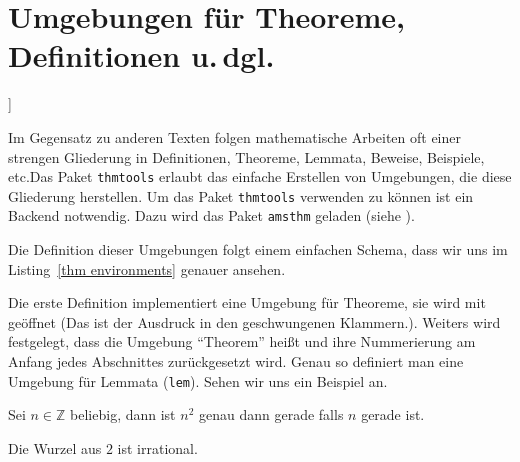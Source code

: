 
\section{Umgebungen für Theoreme, Definitionen u.\,dgl.}]

Im Gegensatz zu anderen Texten folgen mathematische Arbeiten oft einer strengen Gliederung in Definitionen, Theoreme, Lemmata, Beweise, Beispiele, etc.\@ Das Paket \texttt{thmtools} erlaubt das einfache Erstellen von Umgebungen, die diese Gliederung herstellen.
Um das Paket \texttt{thmtools} verwenden zu können ist ein Backend notwendig.
Dazu wird das Paket \texttt{amsthm} geladen (siehe \cite{amsthm}).


Die Definition dieser Umgebungen folgt einem einfachen Schema, dass wir uns im Listing~\ref{thm environments} genauer ansehen.

\begin{figure*}
\begin{example}[caption={Beispiel für die Definition von Theoremumgebungen},
label={thm environments}]
\usepackage{amsthm} %
\usepackage{thmtools}

	
\end{example}
\end{figure*}

Die erste Definition implementiert eine Umgebung für Theoreme, sie wird mit  geöffnet (Das ist der Ausdruck in den geschwungenen Klammern.).
Weiters wird festgelegt, dass die Umgebung "`Theorem"' heißt und ihre Nummerierung am Anfang jedes Abschnittes zurückgesetzt wird.
Genau so definiert man eine Umgebung für Lemmata (\texttt{lem}). Sehen wir uns ein Beispiel an.

\begin{LTXexample}[firstline=3]
\setcounter{thm}{0}
\setcounter{lem0}{0}
\begin{lem0}
    Sei $n \in \mathbb Z$ 
    beliebig, dann ist $n^2$ 
    genau dann gerade 
    falls $n$ gerade ist.
\end{lem0}

\begin{thm}
    Die Wurzel aus $2$ ist 
    irrational.
\end{thm}
\end{LTXexample}

